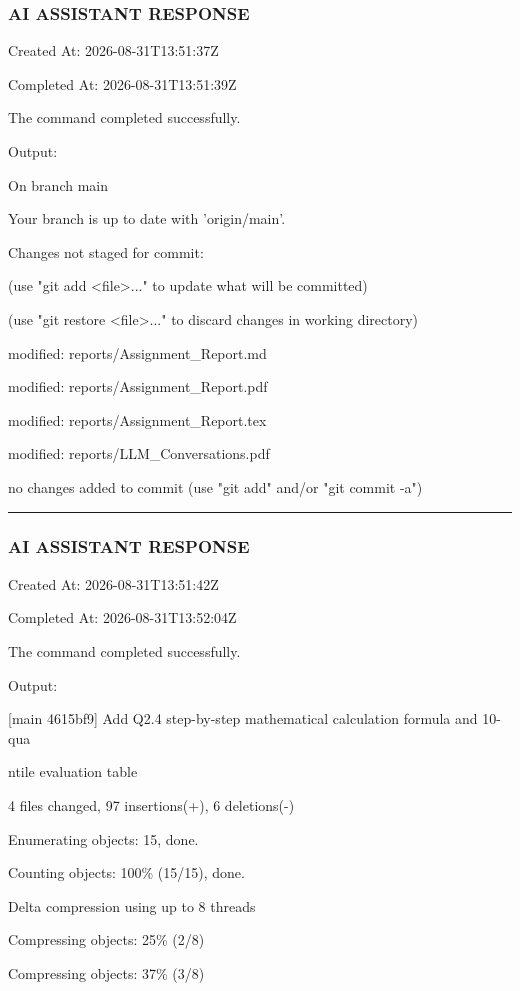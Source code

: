 \documentclass[11pt,a4paper]{article}
\begin{document}
\subsubsection{AI ASSISTANT RESPONSE}

Created At: 2026-08-31T13:51:37Z

Completed At: 2026-08-31T13:51:39Z


The command completed successfully.

Output:

On branch main

Your branch is up to date with 'origin/main'.


Changes not staged for commit:

(use "git add <file>..." to update what will be committed)

(use "git restore <file>..." to discard changes in working directory)

modified:   reports/Assignment\_Report.md

modified:   reports/Assignment\_Report.pdf

modified:   reports/Assignment\_Report.tex

modified:   reports/LLM\_Conversations.pdf


no changes added to commit (use "git add" and/or "git commit -a")


\hrule

\subsubsection{AI ASSISTANT RESPONSE}

Created At: 2026-08-31T13:51:42Z

Completed At: 2026-08-31T13:52:04Z


The command completed successfully.

Output:

[main 4615bf9] Add Q2.4 step-by-step mathematical calculation formula and 10-qua

ntile evaluation table

4 files changed, 97 insertions(+), 6 deletions(-)

Enumerating objects: 15, done.

Counting objects: 100\% (15/15), done.

Delta compression using up to 8 threads

Compressing objects:  25\% (2/8)

Compressing objects:  37\% (3/8)
\end{document}
